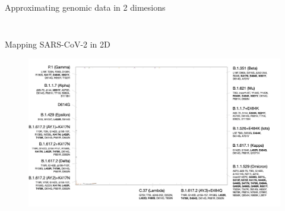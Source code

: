 \documentclass{beamer}
\begin{document}
\begin{frame}{Approximating genomic data in 2 dimesions }
\begin{columns}
\begin{column}{0.4\textwidth}
\begin{figure}
        \end{figure}   
    \end{column}
    \end{columns}
    \centering
    \vfill
    \tiny{\cite{lapedesGeometryShapeSpace2001,smithMappingAntigenicGenetic2004}}
\end{frame}


\begin{frame}{Mapping SARS-CoV-2 in 2D}
        \begin{figure}
        \includegraphics[width=\textwidth]{sars_cov_2_map/wilks_1.png}
    \end{figure}   
    \centering
    \vfill
    \tiny{\cite{wilksMappingSARSCoV2Antigenic2022}}
\end{frame}
\end{document}
